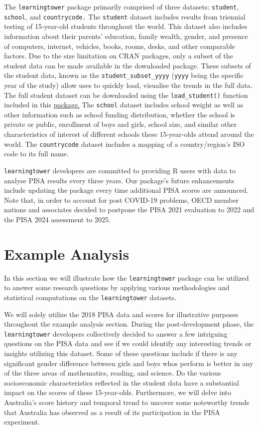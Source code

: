 The \texttt{learningtower} package primarily comprised of three
datasets: \texttt{student}, \texttt{school}, and \texttt{countrycode.}
The \texttt{student} dataset includes results from triennial testing of
15-year-old students throughout the world. This dataset also includes
information about their parents' education, family wealth, gender, and
presence of computers, internet, vehicles, books, rooms, desks, and
other comparable factors. Due to the size limitation on CRAN packages,
only a subset of the student data can be made available in the
downloaded package. These subsets of the student data, known as the
\texttt{student\_subset\_yyyy} (\texttt{yyyy} being the specific year of
the study) allow uses to quickly load, visualise the trends in the full
data. The full student dataset can be downloaded using the
\texttt{load\_student()} function included in this
\href{https://kevinwang09.github.io/learningtower/}{package.} The
\texttt{school} dataset includes school weight as well as other
information such as school funding distribution, whether the school is
private or public, enrollment of boys and girls, school size, and
similar other characteristics of interest of different schools these
15-year-olds attend around the world. The \texttt{countrycode} dataset
includes a mapping of a country/region's ISO code to its full name.

\texttt{learningtower} developers are committed to providing R users
with data to analyse PISA results every three years. Our package's
future enhancements include updating the package every time additional
PISA scores are announced. Note that, in order to account for post
COVID-19 problems, OECD member nations and associates decided to
postpone the PISA 2021 evaluation to 2022 and the PISA 2024 assessment
to 2025.

\hypertarget{example-analysis}{%
\section{Example Analysis}\label{example-analysis}}

In this section we will illustrate how the \texttt{learningtower}
package can be utilized to answer some research questions by applying
various methodologies and statistical computations on the
\texttt{learningtower} datasets.

We will solely utilize the 2018 PISA data and scores for illustrative
purposes throughout the example analysis section. During the
post-development phase, the \texttt{learningtower} developers
collectively decided to answer a few intriguing questions on the PISA
data and see if we could identify any interesting trends or insights
utilizing this dataset. Some of these questions include if there is any
significant gender difference between girls and boys whos perform is
better in any of the three areas of mathematics, reading, and science.
Do the various socioeconomic characteristics reflected in the student
data have a substantial impact on the scores of these 15-year-olds.
Furthermore, we will delve into Australia's score history and temporal
trend to uncover some noteworthy trends that Australia has observed as a
result of its participation in the PISA experiment.

